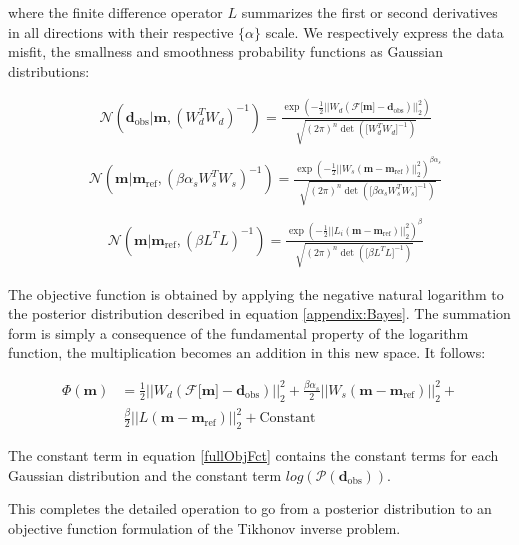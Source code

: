 where the finite difference operator $L$ summarizes the first or second derivatives in all directions with their respective $\{\alpha\}$ scale. We respectively express the data misfit, the smallness and smoothness probability functions as Gaussian distributions:

\begin{align}
&\mathcal{N}(\mathbf{d}_{\text{obs}}|\mathbf{m}, (W_d^TW_d)^{-1}) = {\frac{\exp(-\frac{1}{2}||W_d(\mathcal{F}\lbrack\mathbf{m}\rbrack-\mathbf{d}_{\text{obs}})||_2^2)}{\sqrt{(2\pi)^n\det(\lbrack W_d^TW_d\rbrack^{-1})}}} \label{DataMisfitGaussian}\\
\end{align}
\begin{align}
&\mathcal{N}(\mathbf{m}|\mathbf{m}_{{\text{ref}}}, (\beta\alpha_sW_s^TW_s)^{-1}) = {\frac{\exp(-\frac{1}{2}||W_s(\mathbf{m}-\mathbf{m}_{{\text{ref}}})||_2^2)^{\beta\alpha_s}}{\sqrt{(2\pi)^n\det(\lbrack \beta\alpha_sW_s^TW_s\rbrack^{-1})}}} \label{SmallnessGaussian}\\
\end{align}
\begin{align}
&\mathcal{N}(\mathbf{m}|\mathbf{m}_{{\text{ref}}}, (\beta L^TL)^{-1}) = {\frac{\exp(-\frac{1}{2}||L_i(\mathbf{m}-\mathbf{m}_{{\text{ref}}})||_2^2)^{\beta}}{\sqrt{(2\pi)^n\det(\lbrack \beta L^TL\rbrack^{-1})}}} \label{SmoothnessGaussian}
\end{align}

The objective function is obtained by applying the negative natural logarithm to the posterior distribution described in equation \ref{appendix:Bayes}. The summation form is simply a consequence of the fundamental property of the logarithm function, the multiplication becomes an addition in this new space. It follows:

\begin{align}
\Phi(\mathbf{m}) &= \frac{1}{2}||W_d(\mathcal{F}\lbrack\mathbf{m}\rbrack-\mathbf{d}_{\text{obs}})||_2^2 + \frac{\beta\alpha_s}{2}||W_s(\mathbf{m}-\mathbf{m}_{{\text{ref}}})||_2^2 + \nonumber\\  &~\frac{\beta}{2}||L(\mathbf{m}-\mathbf{m}_{{\text{ref}}})||_2^2 +\text{Constant} \label{fullObjFct}
\end{align}

The constant term in equation \ref{fullObjFct} contains the constant terms for each Gaussian distribution and the constant term $log(\mathcal{P}(\mathbf{d}_{\text{obs}}))$.

This completes the detailed operation to go from a posterior distribution to an objective function formulation of the Tikhonov inverse problem.


